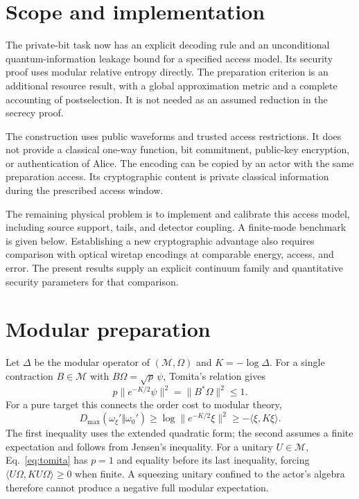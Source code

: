 \documentclass[11pt,a4paper]{article}
\newcommand{\M}{\mathcal M}
\newcommand{\Dmax}{D_{\max}}
\newcommand{\norm}[1]{\lVert #1\rVert}
\begin{document}
\section{Scope and implementation}

The private-bit task now has an explicit decoding rule and an unconditional
quantum-information leakage bound for a specified access model. Its
security proof uses modular relative entropy directly. The preparation
criterion is an additional resource result, with a global approximation
metric and a complete accounting of postselection. It is not needed as an
assumed reduction in the secrecy proof.

The construction uses public waveforms and trusted access restrictions.
It does not provide a classical one-way function, bit commitment, public-key
encryption, or authentication of Alice. The encoding can be copied by an
actor with the same preparation access. Its cryptographic content is
private classical information during the prescribed access window.

The remaining physical problem is to implement and calibrate this access
model, including source support, tails, and detector coupling. A finite-mode
benchmark is given below. Establishing a new cryptographic advantage also
requires comparison with optical wiretap encodings at comparable energy,
access, and error. The present results supply an explicit continuum family
and quantitative security parameters for that comparison.

\appendix
\section{Modular preparation}
\label{app:modular}

Let $\Delta$ be the modular operator of $(\M,\Omega)$ and $K=-\log\Delta$.
For a single contraction $B\in\M$ with $B\Omega=\sqrt p\,\psi$,
Tomita's relation gives
\begin{equation}
p\norm{e^{-K/2}\psi}^2=\norm{B^*\Omega}^2\le1.
\label{eq:tomita}
\end{equation}
For a pure target this connects the order cost to modular theory,
\begin{equation}
\Dmax(\omega_\xi'\Vert\omega_0')
\ge\log\norm{e^{-K/2}\xi}^2\ge-\langle\xi,K\xi\rangle.
\end{equation}
The first inequality uses the extended quadratic form; the second assumes
a finite expectation and follows from Jensen's inequality. For a unitary
$U\in\M$, Eq.~\eqref{eq:tomita} has $p=1$ and equality before its last
inequality, forcing $\langle U\Omega,KU\Omega\rangle\ge0$ when finite.
A squeezing unitary confined to the actor's algebra therefore cannot
produce a negative full modular expectation.
\end{document}
